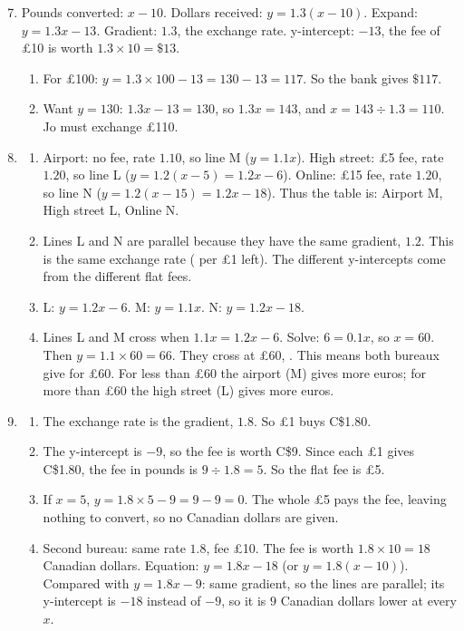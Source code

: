 \documentclass[12pt,a4paper]{article}
\begin{document}
\begin{enumerate}[label=\textbf{Q\arabic*.}, leftmargin=*]
\setcounter{enumi}{6}
\item
Pounds converted: \(x-10\). Dollars received: \(y=1.3(x-10)\). Expand: \(y=1.3x-13\). Gradient: \(1.3\), the exchange rate. y-intercept: \(-13\), the fee of \pounds10 is worth \(1.3\times10=\$13\).
\begin{enumerate}
\item For \pounds100: \(y=1.3\times100-13=130-13=117\). So the bank gives \(\$117\).
\item Want \(y=130\): \(1.3x-13=130\), so \(1.3x=143\), and \(x=143\div1.3=110\). Jo must exchange \pounds110.
\end{enumerate}

\item
\begin{enumerate}
\item Airport: no fee, rate \(1.10\), so line M (\(y=1.1x\)). High street: \pounds5 fee, rate \(1.20\), so line L (\(y=1.2(x-5)=1.2x-6\)). Online: \pounds15 fee, rate \(1.20\), so line N (\(y=1.2(x-15)=1.2x-18\)). Thus the table is: Airport M, High street L, Online N.
\item Lines L and N are parallel because they have the same gradient, \(1.2\). This is the same exchange rate ( per \pounds1 left). The different y-intercepts come from the different flat fees.
\item L: \(y=1.2x-6\). M: \(y=1.1x\). N: \(y=1.2x-18\).
\item Lines L and M cross when \(1.1x=1.2x-6\). Solve: \(6=0.1x\), so \(x=60\). Then \(y=1.1\times60=66\). They cross at \pounds60, . This means both bureaux give  for \pounds60. For less than \pounds60 the airport (M) gives more euros; for more than \pounds60 the high street (L) gives more euros.
\end{enumerate}

\item
\begin{enumerate}
\item The exchange rate is the gradient, \(1.8\). So \pounds1 buys C\$1.80.
\item The y-intercept is \(-9\), so the fee is worth C\$9. Since each \pounds1 gives C\$1.80, the fee in pounds is \(9\div1.8=5\). So the flat fee is \pounds5.
\item If \(x=5\), \(y=1.8\times5-9=9-9=0\). The whole \pounds5 pays the fee, leaving nothing to convert, so no Canadian dollars are given.
\item Second bureau: same rate \(1.8\), fee \pounds10. The fee is worth \(1.8\times10=18\) Canadian dollars. Equation: \(y=1.8x-18\) (or \(y=1.8(x-10)\)). Compared with \(y=1.8x-9\): same gradient, so the lines are parallel; its y-intercept is \(-18\) instead of \(-9\), so it is \(9\) Canadian dollars lower at every \(x\).
\end{enumerate}
\end{enumerate}
\end{document}
